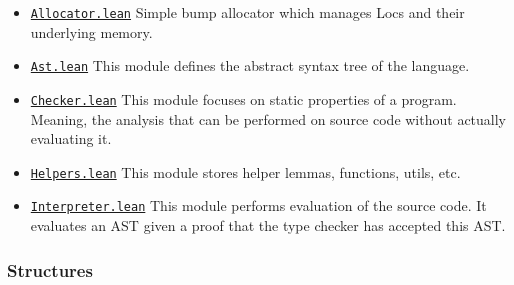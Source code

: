 \begin{itemize}
  \item \href{https://github.com/shilangyu/formal-lang/tree/main/lean/Lang/Allocator.lean}{\texttt{Allocator.lean}} Simple bump allocator which manages Locs and their underlying memory.
  \item \href{https://github.com/shilangyu/formal-lang/tree/main/lean/Lang/Ast.lean}{\texttt{Ast.lean}} This module defines the abstract syntax tree of the language.
  \item \href{https://github.com/shilangyu/formal-lang/tree/main/lean/Lang/Checker.lean}{\texttt{Checker.lean}} This module focuses on static properties of a program. Meaning, the analysis that can be performed on source code without actually evaluating it.
  \item \href{https://github.com/shilangyu/formal-lang/tree/main/lean/Lang/Helpers.lean}{\texttt{Helpers.lean}} This module stores helper lemmas, functions, utils, etc.
  \item \href{https://github.com/shilangyu/formal-lang/tree/main/lean/Lang/Interpreter.lean}{\texttt{Interpreter.lean}} This module performs evaluation of the source code. It evaluates an AST given a proof that the type checker has accepted this AST.
\end{itemize}

\subsubsection{Structures}

